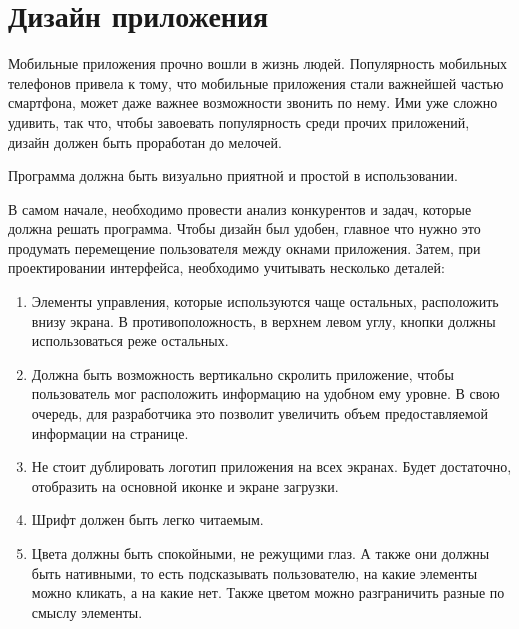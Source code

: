 \section{Дизайн приложения}
Мобильные приложения прочно вошли в жизнь людей. Популярность
мобильных телефонов привела к тому, что мобильные приложения стали
важнейшей частью смартфона, может даже важнее возможности звонить по
нему. Ими уже сложно удивить, так что, чтобы завоевать популярность среди
прочих приложений, дизайн должен быть проработан до мелочей.\par
Программа должна быть визуально приятной и простой в
использовании.\par
В самом начале, необходимо провести анализ конкурентов и задач,
которые должна решать программа. Чтобы дизайн был удобен, главное что
нужно это продумать перемещение пользователя между окнами приложения.
Затем, при проектировании интерфейса, необходимо учитывать несколько
деталей:

\begin{enumerate}
	\item Элементы управления, которые используются чаще остальных,
		расположить внизу экрана. В противоположность, в верхнем левом углу,
		кнопки должны использоваться реже остальных.
	\item Должна быть возможность вертикально скролить приложение,
		чтобы пользователь мог расположить информацию на удобном ему уровне.
		В свою очередь, для разработчика это позволит увеличить объем
		предоставляемой информации на странице.
	\item Не стоит дублировать логотип приложения на всех экранах. Будет
		достаточно, отобразить на основной иконке и экране загрузки.
	\item Шрифт должен быть легко читаемым.
	\item Цвета должны быть спокойными, не режущими глаз. А также они
		должны быть нативными, то есть подсказывать пользователю, на какие
		элементы можно кликать, а на какие нет. Также цветом можно
		разграничить разные по смыслу элементы.
\end{enumerate}

